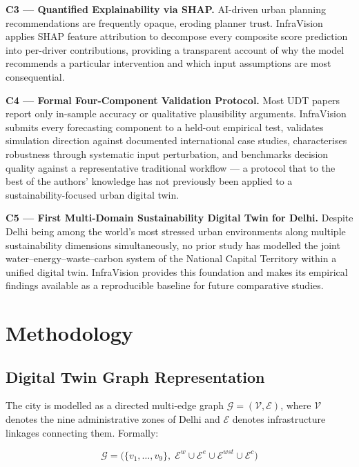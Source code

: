 \documentclass[conference]{IEEEtran}
\begin{document}
\textbf{C3 --- Quantified Explainability via SHAP.}
AI-driven urban planning recommendations are frequently opaque,
eroding planner trust. InfraVision applies SHAP feature attribution to
decompose every composite score prediction into per-driver contributions,
providing a transparent account of why the model recommends a particular
intervention and which input assumptions are most consequential.

\textbf{C4 --- Formal Four-Component Validation Protocol.}
Most UDT papers report only in-sample accuracy or qualitative
plausibility arguments. InfraVision submits every forecasting component
to a held-out empirical test, validates simulation direction against
documented international case studies, characterises robustness through
systematic input perturbation, and benchmarks decision quality against a
representative traditional workflow --- a protocol that to the best of
the authors' knowledge has not previously been applied to a
sustainability-focused urban digital twin.

\textbf{C5 --- First Multi-Domain Sustainability Digital Twin for Delhi.}
Despite Delhi being among the world's most stressed urban environments
along multiple sustainability dimensions simultaneously, no prior study
has modelled the joint water--energy--waste--carbon system of the
National Capital Territory within a unified digital twin. InfraVision
provides this foundation and makes its empirical findings available as
a reproducible baseline for future comparative studies.

\section{Methodology}
\label{sec:method}

\subsection{Digital Twin Graph Representation}

The city is modelled as a directed multi-edge graph
$\mathcal{G} = (\mathcal{V}, \mathcal{E})$, where $\mathcal{V}$ denotes
the nine administrative zones of Delhi and $\mathcal{E}$ denotes
infrastructure linkages connecting them. Formally:

\begin{equation}
\mathcal{G} = \bigl(\{v_1, \ldots, v_9\},\; \mathcal{E}^w \cup
\mathcal{E}^e \cup \mathcal{E}^{wst} \cup \mathcal{E}^c\bigr)
\label{eq:graph}
\end{equation}
\end{document}
